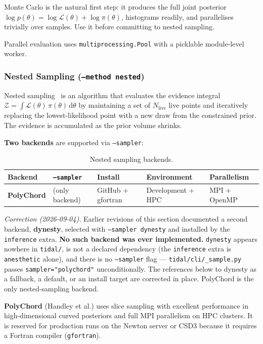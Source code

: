 Monte Carlo is the natural first step: it produces the full joint posterior
$\log p(\theta) = \log\mathcal{L}(\theta) + \log\pi(\theta)$, histograms readily,
and parallelises trivially over samples.  Use it before committing to
nested sampling.

Parallel evaluation uses \texttt{multiprocessing.Pool} with a picklable
module-level worker.

\subsubsection{Nested Sampling (\texttt{--method nested})}
\label{sec:inference-nested}

Nested sampling~\cite{skilling2004nested} is an algorithm that evaluates the
evidence integral $\mathcal{Z} = \int \mathcal{L}(\theta)\,\pi(\theta)\,\mathrm{d}\theta$
by maintaining a set of $N_\mathrm{live}$ live points and iteratively
replacing the lowest-likelihood point with a new draw from the constrained
prior.  The evidence is accumulated as the prior volume shrinks.

\textbf{Two backends} are supported via \texttt{--sampler}:

\begin{table}[htbp]
\centering
\caption{Nested sampling backends.}
\label{tab:nested-backends}
\begin{tabular}{@{}lllll@{}}
\toprule
Backend     & \texttt{--sampler} & Install & Environment & Parallelism \\
\midrule
\textbf{PolyChord} & (only backend) & GitHub + gfortran & Development + HPC & MPI + OpenMP \\
\bottomrule
\end{tabular}
\end{table}

\emph{Correction (2026-09-04).} Earlier revisions of this section documented a
second backend, \textbf{dynesty}, selected with \texttt{--sampler dynesty} and
installed by the \texttt{inference} extra.  \textbf{No such backend was ever
implemented.}  \texttt{dynesty} appears nowhere in \texttt{tidal/}, is not a
declared dependency (the \texttt{inference} extra is \texttt{anesthetic} alone),
and there is no \texttt{--sampler} flag --- \texttt{tidal/cli/\_sample.py} passes
\texttt{sampler="polychord"} unconditionally.  The references below to dynesty as
a fallback, a default, or an install target are corrected in place.  PolyChord is
the only nested-sampling backend.

\textbf{PolyChord} (Handley et al.) uses slice sampling with excellent
performance in high-dimensional curved posteriors and full MPI parallelism
on HPC clusters.  It is reserved for production runs on the Newton server
or CSD3 because it requires a Fortran compiler (\texttt{gfortran}).

